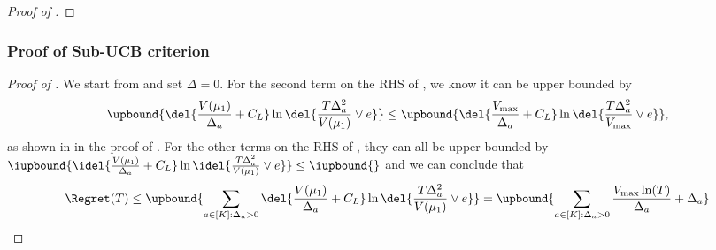 \begin{proof}[Proof of ]
\end{proof}

\subsubsection{Proof of Sub-UCB criterion}
\begin{proof}[Proof of ]
    
    We start from  and set $\Delta = 0$. For the second term on the RHS of , we know it can be upper bounded by 
    \[
    \upbound{\del{\frac{V(\mu_1)}{\Delta_a} + C_L}\ln\del{\frac{T\Delta_a^2}{V(\mu_1)} \vee e}}
    \leq
    \upbound{\del{\frac{V_{\max}}{\Delta_a} + C_L}\ln\del{\frac{T\Delta_a^2}{V_{\max}} \vee e}},
    \]
    as shown in  in the proof of . 
    For the other terms on the RHS of , they can all be upper bounded by
    $\iupbound{\idel{\frac{V(\mu_1)}{\Delta_a} + C_L}\ln\idel{\frac{T\Delta_a^2}{V(\mu_1)} \vee e}} \leq \iupbound{}$ and we can conclude that
    \[
        \Regret(T) \leq \upbound{ \sum_{a\in[K]: \Delta_a > 0 }\del{\frac{V(\mu_1)}{\Delta_a} + C_L}\ln\del{\frac{T\Delta_a^2}{V(\mu_1)} \vee e}}
        =
        \upbound{ \sum_{a\in[K]: \Delta_a > 0} \frac{V_{\max}\ln(T)}{\Delta_a} + \Delta_a }
    \]
\end{proof}
